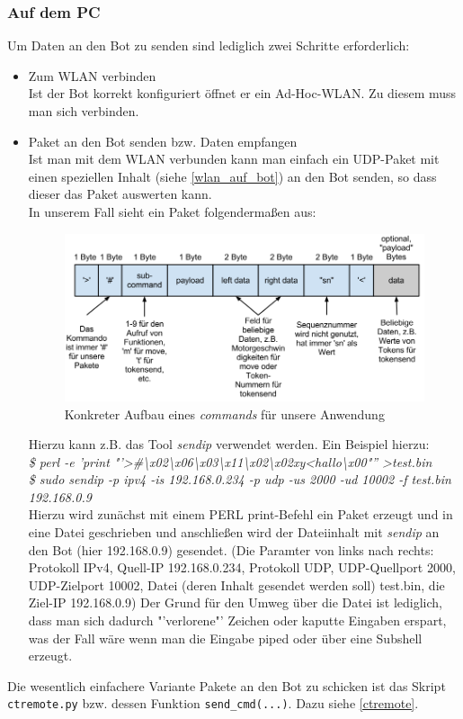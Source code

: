 \subsubsection{Auf dem PC}
Um Daten an den Bot zu senden sind lediglich zwei Schritte erforderlich:
\begin{itemize}
    \item Zum WLAN verbinden\\
    Ist der Bot korrekt konfiguriert öffnet er ein Ad-Hoc-WLAN. Zu diesem muss man sich verbinden.
    \item Paket an den Bot senden bzw. Daten empfangen\\
    Ist man mit dem WLAN verbunden kann man einfach ein UDP-Paket mit einen speziellen Inhalt (siehe \ref{wlan_auf_bot}) an den Bot senden, so dass dieser das Paket auswerten kann.\\
    In unserem Fall sieht ein Paket folgendermaßen aus:
    \begin{figure}[H]
        \centering
        \includegraphics[scale=0.5]{pic/ctBotWlanKonkret}
        \caption{Konkreter Aufbau eines \textit{commands} für unsere Anwendung}
        \label{ctBotWlanKonkret}
    \end{figure}
    
    Hierzu kann z.B. das Tool \textit{sendip} verwendet werden. Ein Beispiel hierzu:\\
    \textit{\$ perl -e 'print "'\textgreater\#\textbackslash x02\textbackslash x06\textbackslash x03\textbackslash x11\textbackslash x02\textbackslash x02xy\textless hallo\textbackslash x00"'' \textgreater test.bin\\
    \$ sudo sendip -p ipv4 -is 192.168.0.234 -p udp -us 2000 -ud 10002 -f test.bin 192.168.0.9}\\
    Hierzu wird zunächst mit einem PERL print-Befehl ein Paket erzeugt und in eine Datei geschrieben und anschließen wird der Dateiinhalt mit \textit{sendip} an den Bot (hier 192.168.0.9) gesendet.
    (Die Paramter von links nach rechts: Protokoll IPv4, Quell-IP 192.168.0.234, Protokoll UDP, UDP-Quellport 2000, UDP-Zielport 10002, Datei (deren Inhalt gesendet werden soll) test.bin, die Ziel-IP 192.168.0.9)
    Der Grund für den Umweg über die Datei ist lediglich, dass man sich dadurch "'verlorene"' Zeichen oder kaputte Eingaben erspart, was der Fall wäre wenn man die Eingabe piped oder über eine Subshell erzeugt.
\end{itemize}
Die wesentlich einfachere Variante Pakete an den Bot zu schicken ist das Skript \verb+ctremote.py+ bzw. dessen Funktion \verb+send_cmd(...)+. Dazu siehe \ref{ctremote}.

